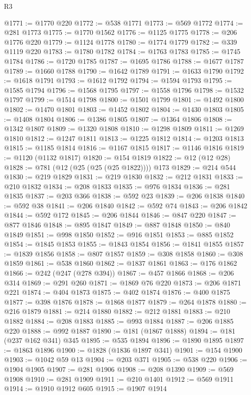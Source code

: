 \begin{lexlean}{R3}
\begin{coremodule}
@1771 := @1770 @220
@1772 := @538 @1771
@1773 := @569 @1772
@1774 := @281 @1773
@1775 := @1770 @1562
@1776 := @1125 @1775
@1778 := @206 @1776 @220
@1779 := @1124 @1778
@1780 := @1774 @1779
@1782 := @339 @1119 @220
@1783 := @1780 @1782
@1784 := @1763 @1783
@1785 := @1745 @1784
@1786 := @1720 @1785
@1787 := @1695 @1786
@1788 := @1677 @1787
@1789 := @1660 @1788
@1790 := @1642 @1789
@1791 := @1633 @1790
@1792 := @1618 @1791
@1793 := @1612 @1792
@1794 := @1594 @1793
@1795 := @1585 @1794
@1796 := @1568 @1795
@1797 := @1558 @1796
@1798 := @1532 @1797
@1799 := @1514 @1798
@1800 := @1501 @1799
@1801 := @1492 @1800
@1802 := @1470 @1801
@1803 := @1452 @1802
@1804 := @1430 @1803
@1805 := @1408 @1804
@1806 := @1386 @1805
@1807 := @1364 @1806
@1808 := @1342 @1807
@1809 := @1320 @1808
@1810 := @1298 @1809
@1811 := @1269 @1810
@1812 := @1247 @1811
@1813 := @1225 @1812
@1814 := @1203 @1813
@1815 := @1185 @1814
@1816 := @1167 @1815
@1817 := @1146 @1816
@1819 := @1120 (@1132 @1817)
@1820 := @154 @1819
@1822 := @12 (@12 @28)
@1828 := @781 (@12 (@25 (@25 (@25 @1822)))) @173
@1829 := @214 @544
@1830 := @219 @1829
@1831 := @219 @1830
@1832 := @212 @1831
@1833 := @210 @1832
@1834 := @208 @1833
@1835 := @976 @1834
@1836 := @281 @1835
@1837 := @203 @366
@1838 := @592 @23
@1839 := @206 @1838
@1840 := @592 @38
@1841 := @206 @1840
@1842 := @592 @74
@1843 := @206 @1842
@1844 := @592 @172
@1845 := @206 @1844
@1846 := @847 @220
@1847 := @877 @1846
@1848 := @895 @1847
@1849 := @887 @1848
@1850 := @840 @1849
@1851 := @998 @1850
@1852 := @916 @1851
@1853 := @885 @1852
@1854 := @1845 @1853
@1855 := @1843 @1854
@1856 := @1841 @1855
@1857 := @1839 @1856
@1858 := @807 @1857
@1859 := @308 @1858
@1860 := @308 @1859
@1861 := @538 @1860
@1862 := @1837 @1861
@1863 := @176 @1862
@1866 := @242 (@247 (@278 @394))
@1867 := @457 @1866
@1868 := @206 @314
@1869 := @291 @260
@1871 := @1869 @76 @220
@1873 := @206 @1871 @221
@1874 := @404 @1873
@1875 := @402 @1874
@1876 := @400 @1875
@1877 := @398 @1876
@1878 := @1868 @1877
@1879 := @264 @1878
@1880 := @216 @1879
@1881 := @214 @1880
@1882 := @212 @1881
@1883 := @210 @1882
@1884 := @208 @1883
@1885 := @993 @1884
@1887 := @206 @1885 @220
@1888 := @992 @1887
@1890 := @181 (@1867 @1888)
@1894 := @181 (@237 @162 @341) @345
@1895 := @535 @1894
@1896 := @1890 @1895
@1897 := @1863 @1896
@1900 := @1828 (@1836 @1897 @341)
@1901 := @154 @1900
@1903 := @1042 @59 @13
@1904 := @203 @371
@1905 := @538 @220
@1906 := @1904 @1905
@1907 := @281 @1906
@1908 := @208 @1390
@1909 := @569 @1908
@1910 := @281 @1909
@1911 := @210 @1401
@1912 := @569 @1911
@1914 := @1910 @1912 @605
@1915 := @1907 @1914

\end{coremodule}
\end{lexlean}
